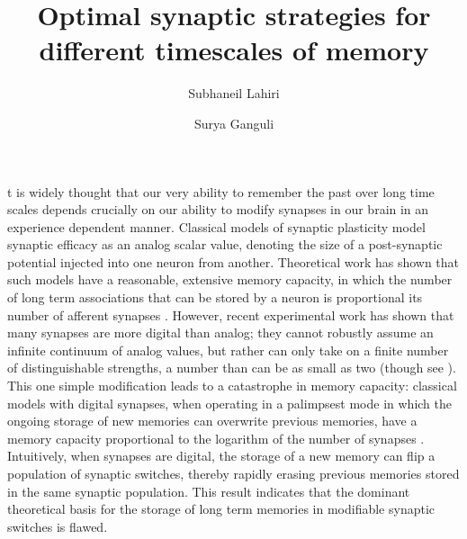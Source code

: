 \documentclass[9pt,twocolumn,twoside,lineno]{pnas-new}
\title{Optimal synaptic strategies for different timescales of memory}
\author[a,1,2]{Subhaneil Lahiri}
\author[b,1]{Surya Ganguli}
\affil[a]{Department of Applied Physics, Stanford University, Stanford CA}
\begin{document}

\verticaladjustment{-2pt}

\maketitle
\thispagestyle{firststyle}

t is widely thought that our very ability to remember the past over long time scales depends crucially on our ability to modify synapses in our brain in an experience dependent manner.
Classical models of synaptic plasticity model synaptic efficacy as an analog scalar value, denoting the size of a post-synaptic potential injected into one neuron from another.
Theoretical work has shown that such models have a reasonable, extensive memory capacity, in which the number of long term associations that can be stored by a neuron is proportional its number of afferent synapses \cite{Hopfield1982model,Amit1985hopfield,Gardner1988perceptron}.
However, recent experimental work has shown that many synapses are more digital than analog; they cannot robustly assume an infinite continuum of analog values, but rather can only take on a finite number of distinguishable strengths, a number than can be as small as two \cite{Bliss1993LTP,Petersen1998allornone,O'Connor2005switch} (though see \cite{Enoki2009graded}).
This one simple modification leads to a catastrophe in memory capacity:  classical models with digital synapses, when operating in a palimpsest mode in which the ongoing storage of new memories can overwrite previous memories, have a memory capacity proportional to the logarithm of the number of synapses \cite{amit1992constraints,amit1994learning}.
Intuitively, when synapses are digital, the storage of a new memory can flip a population of synaptic switches, thereby rapidly erasing previous memories stored in the same synaptic population. This result indicates that the dominant theoretical basis for the storage of long term memories in modifiable synaptic switches is flawed.
\end{document}

